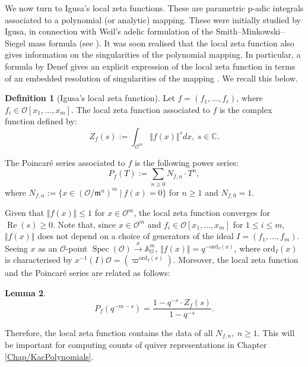 \documentclass[11pt,english]{article}
\numberwithin{equation}{section}
\numberwithin{figure}{section}
\theoremstyle{definition}
\newtheorem{df}{Definition}[subsection]
\theoremstyle{plain}
\newtheorem{lem}[df]{Lemma}
\theoremstyle{remark}
\DeclareMathOperator{\Rea}{Re}
\DeclareMathOperator{\Spec}{Spec}
\newcommand\CC{\mathbb{C}}
\begin{document}
We now turn to Igusa's local zeta functions. These are parametric
p-adic integrals associated to a polynomial (or analytic) mapping.
These were initially studied by Igusa, in connection with Weil's adelic
formulation of the Smith--Minkowski--Siegel mass formula (see \cite[Ch. 8]{Igu00}).
It was soon realised that the local zeta function also gives information
on the singularities of the polynomial mapping. In particular, a formula
by Denef gives an explicit expression of the local zeta function in
terms of an embedded resolution of singularities of the mapping \cite{Den87}.
We recall this below.

\begin{df}[Igusa's local zeta function]

Let $f=(f_{1},\ldots,f_{r})$, where $f_{i}\in\mathcal{O}[x_{1},\ldots,x_{m}]$.
The local zeta function associated to $f$ is the complex function
defined by:\[
Z_f(s):=\int_{\mathcal{O}^m}\Vert f(x)\Vert^sdx,\ s\in\CC.
\]

The Poincaré series associated to $f$ is the following power series:\[
P_f(T):=\sum_{n\geq0}N_{f,n}\cdot T^n,
\]where $N_{f,n}:=\{x\in(\mathcal{O}/\mathfrak{m}^{n})^{m}\ \vert\ f(x)=0\}$
for $n\geq1$ and $N_{f,0}=1$.

\end{df}

Given that $\Vert f(x)\Vert\leq1$ for $x\in\mathcal{O}^{m}$, the
local zeta function converges for $\Rea(s)\geq0$. Note that, since
$x\in\mathcal{O}^{m}$ and $f_{i}\in\mathcal{O}[x_{1},\ldots,x_{m}]$
for $1\leq i\leq m$, $\Vert f(x)\Vert$ does not depend on a choice
of generators of the ideal $I=(f_{1},\ldots,f_{m})$. Seeing $x$
as an $\mathcal{O}$-point $\Spec(\mathcal{O})\overset{x}{\rightarrow}\mathbb{A}_{\mathcal{O}}^{m}$,
$\Vert f(x)\Vert=q^{-\mathrm{ord}_{I}(x)}$, where $\mathrm{ord}_{I}(x)$
is characterised by $x^{-1}(I)\mathcal{O}=(\varpi^{\mathrm{ord}_{I}(x)})$.
Moreover, the local zeta function and the Poincaré series are related
as follows:

\begin{lem}{\cite[Thm. 8.2.2.]{Igu00}} \label{Lem/IgusaVSPoincar=0000E9}\[
P_f(q^{-m-s})=\frac{1-q^{-s}\cdot Z_f(s)}{1-q^{-s}}.
\]\end{lem}

Therefore, the local zeta function contains the data of all $N_{f,n},\ n\geq1$.
This will be important for computing counts of quiver representations
in Chapter \ref{Chap/KacPolynomials}.
\end{document}
